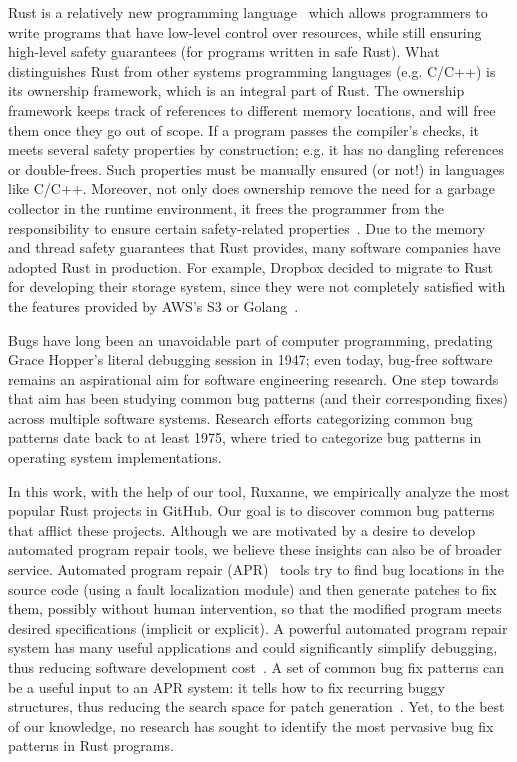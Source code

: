 Rust is a relatively new programming language~\citep{klabnik2019rust} which allows programmers to write programs that have low-level control over resources, while still ensuring high-level safety guarantees (for programs written in safe Rust). What distinguishes Rust from other systems programming languages (e.g. C/C++) is its ownership framework, which is an integral part of Rust. The ownership framework keeps track of references to different memory locations, and will free them once they go out of scope. If a program passes the compiler’s checks, it meets several safety properties by construction; e.g. it has no dangling references or double-frees. Such properties must be manually ensured (or not!) in languages like C/C++. Moreover, not only does ownership remove the need for a garbage collector in the runtime environment, it frees the programmer from the responsibility to ensure certain safety-related properties~\citep{qin2020understanding}. Due to the memory and thread safety guarantees that Rust provides, many software companies have adopted Rust in production. For example, Dropbox decided to migrate to Rust for developing their storage system, since they were not completely satisfied with the features provided by AWS’s S3 or Golang~\citep{dropbox}.

Bugs have long been an unavoidable part of computer programming, predating Grace Hopper's literal debugging session in 1947; even today, bug-free software remains an aspirational aim for software engineering research. One step towards that aim has been studying common bug patterns (and their corresponding fixes) across multiple software systems. Research efforts categorizing common bug patterns date back to at least 1975, where \cite{endres1975analysis} tried to categorize bug patterns in operating system implementations.  

In this work, with the help of our tool, Ruxanne, we empirically analyze the most popular Rust projects in GitHub. Our goal is to discover common bug patterns that afflict these projects. Although we are motivated by a desire to develop automated program repair tools, we believe these insights can also be of broader service. Automated program repair (APR)~\citep{goues2019automated,liu2018survey} tools try to find bug locations in the source code (using a fault localization module) and then generate patches to fix them, possibly without human intervention, so that the modified program meets desired specifications (implicit or explicit). A powerful automated program repair system has many useful applications and could significantly simplify debugging, thus reducing software development cost~\citep{le2012systematic}. A set of common bug fix patterns can be a useful input to an APR system: it tells how to fix recurring buggy structures, thus reducing the search space for patch generation~\citep{jeffrey2009bugfix}. 
Yet, to the best of our knowledge, no research has sought to identify the most pervasive bug fix patterns in Rust programs.

